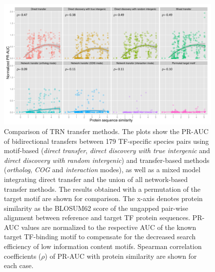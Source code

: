 \begin{figure}
  \centering
  \includegraphics[width=\textwidth]{figures/chapter3/comparison-transfer-methods}
  \caption{Comparison of TRN transfer methods. The plots show the PR-AUC of
    bidirectional transfers between 179 TF-specific species pairs using
    motif-based (\textit{direct transfer}, \textit{direct discovery with true
      intergenic} and \textit{direct discovery with random intergenic}) and
    transfer-based methods (\textit{ortholog}, \textit{COG} and
    \textit{interaction} modes), as well as a mixed model integrating direct
    transfer and the union of all network-based transfer methods. The results
    obtained with a permutation of the target motif are shown for
    comparison. The x-axis denotes protein similarity as the BLOSUM62 score of
    the ungapped pair-wise alignment between reference and target TF protein
    sequences. PR-AUC values are normalized to the respective AUC of the known
    target TF-binding motif to compensate for the decreased search efficiency
    of low information content motifs. Spearman correlation coefficients
    ($\rho$) of PR-AUC with protein similarity are shown for each case.}
\label{fig:comparison-transfer-methods}
\end{figure}

